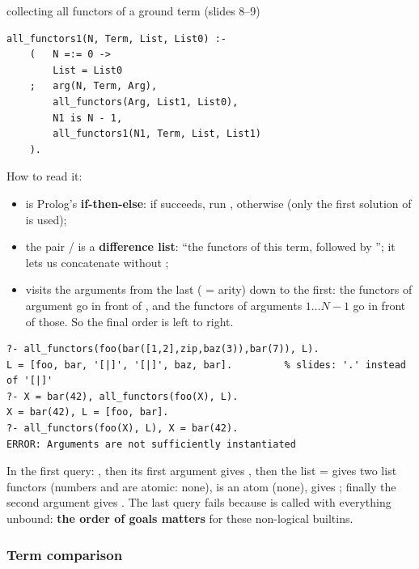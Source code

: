 \begin{nbexample}{collecting all functors of a ground term (slides 8--9)}
\begin{verbatim}
all_functors1(N, Term, List, List0) :-
    (   N =:= 0 ->
        List = List0
    ;   arg(N, Term, Arg),
        all_functors(Arg, List1, List0),
        N1 is N - 1,
        all_functors1(N1, Term, List, List1)
    ).
\end{verbatim}
How to read it:
\begin{itemize}[nosep]
  \item {} is Prolog's \textbf{if-then-else}: if 
        succeeds, run , otherwise  (only the first solution of
         is used);
  \item the pair / is a \textbf{difference list}: ``the functors of
        this term, followed by ''; it lets us concatenate without ;
  \item {} visits the arguments from the last ( = arity) down to
        the first: the functors of argument  go in front of , and the
        functors of arguments $1 \ldots N-1$ go in front of those. So the final order is
        left to right.
\end{itemize}
\begin{verbatim}
?- all_functors(foo(bar([1,2],zip,baz(3)),bar(7)), L).
L = [foo, bar, '[|]', '[|]', baz, bar].         % slides: '.' instead of '[|]'
?- X = bar(42), all_functors(foo(X), L).
X = bar(42), L = [foo, bar].
?- all_functors(foo(X), L), X = bar(42).
ERROR: Arguments are not sufficiently instantiated
\end{verbatim}
In the first query: , then its first argument  gives , then
the list \code{[1,2]} =  gives two list functors (numbers and
\code{[]} are atomic: none),  is an atom (none),  gives ;
finally the second argument  gives . The last query fails because
 is called with everything unbound: \textbf{the order of goals
matters} for these non-logical builtins.
\end{nbexample}

\subsubsection{Term comparison}


